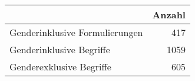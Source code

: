 
\begin{tabular}{lr}
\toprule
 & Anzahl\\
\midrule
Genderinklusive Formulierungen & 417\\
Genderinklusive Begriffe & 1059\\
Genderexklusive Begriffe & 605\\
\bottomrule
\end{tabular}